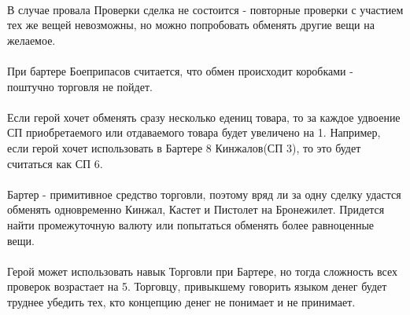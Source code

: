 \paragraph{}В случае провала Проверки сделка не состоится - повторные проверки с участием тех же вещей невозможны, но можно попробовать обменять другие вещи на желаемое.
\paragraph{}При бартере Боеприпасов считается, что обмен происходит коробками - поштучно торговля не пойдет.
\paragraph{}Если герой хочет обменять сразу несколько едениц товара, то за каждое удвоение СП приобретаемого или отдаваемого товара будет увеличено на 1. Например, если герой хочет использовать в Бартере 8 Кинжалов(СП 3), то это будет считаться как СП 6.
\paragraph{}Бартер - примитивное средство торговли, поэтому вряд ли за одну сделку удастся обменять одновременно Кинжал, Кастет и Пистолет на Бронежилет. Придется найти промежуточную валюту или попытаться обменять более равноценные вещи.
\paragraph{}Герой может использовать навык Торговли при Бартере, но тогда сложность всех проверок возрастает на 5. Торговцу, привыкшему говорить языком денег будет труднее убедить тех, кто концепцию денег не понимает и не принимает.
